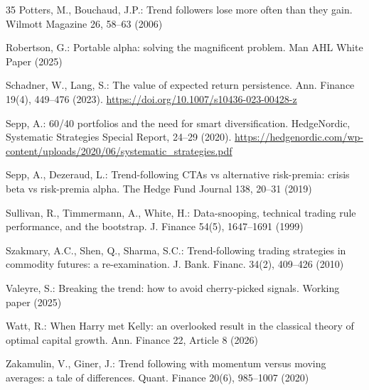 \documentclass[hidelinks]{siamonline250211}
\begin{document}
\begin{thebibliography}{35}
	 Potters, M., Bouchaud, J.P.: Trend followers lose more often than they gain. Wilmott Magazine 26, 58--63 (2006)
	
	 Robertson, G.: Portable alpha: solving the magnificent problem. Man AHL White Paper (2025)
	
	 Schadner, W., Lang, S.: The value of expected return persistence. Ann. Finance 19(4), 449--476 (2023). \url{https://doi.org/10.1007/s10436-023-00428-z}
	
	 Sepp, A.: 60/40 portfolios and the need for smart diversification. HedgeNordic, Systematic Strategies Special Report, 24--29 (2020). \url{https://hedgenordic.com/wp-content/uploads/2020/06/systematic_strategies.pdf}
	
	 Sepp, A., Dezeraud, L.: Trend-following CTAs vs alternative risk-premia: crisis beta vs risk-premia alpha. The Hedge Fund Journal 138, 20--31 (2019)
	
	 Sullivan, R., Timmermann, A., White, H.: Data-snooping, technical trading rule performance, and the bootstrap. J. Finance 54(5), 1647--1691 (1999)
	
	 Szakmary, A.C., Shen, Q., Sharma, S.C.: Trend-following trading strategies in commodity futures: a re-examination. J. Bank. Financ. 34(2), 409--426 (2010)
	
	 Valeyre, S.: Breaking the trend: how to avoid cherry-picked signals. Working paper (2025)
	
	 Watt, R.: When Harry met Kelly: an overlooked result in the classical theory of optimal capital growth. Ann. Finance 22, Article 8 (2026)
	
	 Zakamulin, V., Giner, J.: Trend following with momentum versus moving averages: a tale of differences. Quant. Finance 20(6), 985--1007 (2020)
	
\end{thebibliography}
\end{document}
